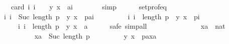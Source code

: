 \begin{isabellebody}
\ \ \ \ \ \ \ \ card\ {\isacharbraceleft}{\kern0pt}i{\isachardot}{\kern0pt}\ i\ {\isacharequal}{\kern0pt}\ {}\ {\isasymand}\ {\isacharparenleft}{\kern0pt}y{\isacharcomma}{\kern0pt}\ x{\isacharparenright}{\kern0pt}\ {\isasymin}\ {\isacharbrackleft}{\kern0pt}a{\isacharbrackright}{\kern0pt}{\isacharbang}{\kern0pt}i{\isacharbraceright}{\kern0pt}{\isachardoublequoteclose}\isanewline
\ \ \ \ \ \ \isamarkupfalse%
\ simp\isanewline
\ \ \ \ \isamarkupfalse%
\ set{\isacharunderscore}{\kern0pt}prof{\isacharunderscore}{\kern0pt}eq{\isacharcolon}{\kern0pt}\isanewline
\ \ \ \ \ \ {\isachardoublequoteopen}{\isacharbraceleft}{\kern0pt}i{\isachardot}{\kern0pt}\ i\ {\isacharless}{\kern0pt}\ Suc\ {\isacharparenleft}{\kern0pt}length\ p{\isacharparenright}{\kern0pt}\ {\isasymand}\ {\isacharparenleft}{\kern0pt}y{\isacharcomma}{\kern0pt}\ x{\isacharparenright}{\kern0pt}\ {\isasymin}\ {\isacharparenleft}{\kern0pt}p{\isacharat}{\kern0pt}{\isacharbrackleft}{\kern0pt}a{\isacharbrackright}{\kern0pt}{\isacharparenright}{\kern0pt}{\isacharbang}{\kern0pt}i{\isacharbraceright}{\kern0pt}\ {\isacharequal}{\kern0pt}\isanewline
\ \ \ \ \ \ \ \ {\isacharbraceleft}{\kern0pt}i{\isachardot}{\kern0pt}\ i\ {\isacharless}{\kern0pt}\ length\ p\ {\isasymand}\ {\isacharparenleft}{\kern0pt}y{\isacharcomma}{\kern0pt}\ x{\isacharparenright}{\kern0pt}\ {\isasymin}\ p{\isacharbang}{\kern0pt}i{\isacharbraceright}{\kern0pt}\ {\isasymunion}\isanewline
\ \ \ \ \ \ \ \ \ \ {\isacharbraceleft}{\kern0pt}i{\isachardot}{\kern0pt}\ i\ {\isacharequal}{\kern0pt}\ length\ p\ {\isasymand}\ {\isacharparenleft}{\kern0pt}y{\isacharcomma}{\kern0pt}\ x{\isacharparenright}{\kern0pt}\ {\isasymin}\ {\isacharbrackleft}{\kern0pt}a{\isacharbrackright}{\kern0pt}{\isacharbang}{\kern0pt}{}{\isacharbraceright}{\kern0pt}{\isachardoublequoteclose}\isanewline
\ \ \ \ \isamarkupfalse%
\ {\isacharparenleft}{\kern0pt}safe{\isacharcomma}{\kern0pt}\ simp{\isacharunderscore}{\kern0pt}all{\isacharparenright}{\kern0pt}\isanewline
\ \ \ \ \ \ \isamarkupfalse%
\isanewline
\ \ \ \ \ \ \ \ xa\ {\isacharcolon}{\kern0pt}{\isacharcolon}{\kern0pt}\ nat\isanewline
\ \ \ \ \ \ \isamarkupfalse%
\isanewline
\ \ \ \ \ \ \ \ {\isachardoublequoteopen}xa\ {\isacharless}{\kern0pt}\ Suc\ {\isacharparenleft}{\kern0pt}length\ p{\isacharparenright}{\kern0pt}{\isachardoublequoteclose}\ \isanewline
\ \ \ \ \ \ \ \ {\isachardoublequoteopen}{\isacharparenleft}{\kern0pt}y{\isacharcomma}{\kern0pt}\ x{\isacharparenright}{\kern0pt}\ {\isasymin}\ {\isacharparenleft}{\kern0pt}p{\isacharat}{\kern0pt}{\isacharbrackleft}{\kern0pt}a{\isacharbrackright}{\kern0pt}{\isacharparenright}{\kern0pt}{\isacharbang}{\kern0pt}xa{\isachardoublequoteclose}\ \isanewline

\end{isabellebody}
